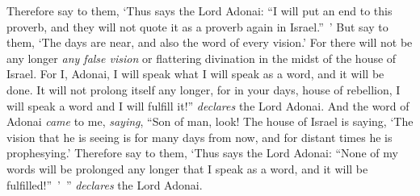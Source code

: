 \begin{biblechapter}
\verse Therefore say to them, ‘Thus says the Lord Adonai: “I will put an end to this proverb, and they will not quote it as a proverb again in Israel.” ’ But say to them, ‘The days are near, and also the word of every vision.’
\verse For there will not be any longer \textit{any false vision} or flattering divination in the midst of the house of Israel.
\verse For I, Adonai, I will speak what I will speak as a word, and it will be done. It will not prolong itself any longer, for in your days, house of rebellion, I will speak a word and I will fulfill it!” \textit{declares} the Lord Adonai.
\verse And the word of Adonai \textit{came} to me, \textit{saying},
\verse “Son of man, look! The house of Israel is saying, ‘The vision that he is seeing is for many days from now, and for distant times he is prophesying.’
\verse Therefore say to them, ‘Thus says the Lord Adonai: “None of my words will be prolonged any longer that I speak as a word, and it will be fulfilled!” ’ ” \textit{declares} the Lord Adonai.
\end{biblechapter}

